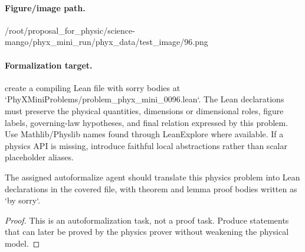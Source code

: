 \paragraph{Figure/image path.}
/root/proposal\_for\_physic/science-mango/phyx\_mini\_run/phyx\_data/test\_image/96.png

\paragraph{Formalization target.}
create a compiling Lean file with sorry bodies at `PhyXMiniProblems/problem\_phyx\_mini\_0096.lean`. The Lean declarations must preserve the physical quantities, dimensions or dimensional roles, figure labels, governing-law hypotheses, and final relation expressed by this problem.
Use Mathlib/Physlib names found through LeanExplore where available. If a physics API is missing, introduce faithful local abstractions rather than scalar placeholder aliases.

\begin{theorem}
\label{thm:physics:phyx_mini_0096:target}
The assigned autoformalize agent should translate this physics problem into Lean declarations in the covered file, with theorem and lemma proof bodies written as `by sorry`.
\end{theorem}
\begin{proof}
This is an autoformalization task, not a proof task. Produce statements that can later be proved by the physics prover without weakening the physical model.
\end{proof}

